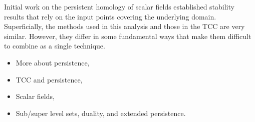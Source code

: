 Initial work on the persistent homology of scalar fields established stability results that rely on the input points covering the underlying domain.
Superficially, the methods used in this analysis and those in the TCC are very similar.
However, they differ in some fundamental ways that make them difficult to combine as a single technique.

\begin{itemize}
  \item More about persistence,
  \item TCC and persistence,
  \item Scalar fields,
  \item Sub/super level sets, duality, and extended persistence.
\end{itemize}

